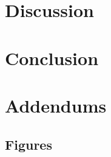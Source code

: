 \documentclass{article}
\begin{document}
\section{Discussion}
\label{sec:discussion}



\section{Conclusion}
\label{sec:conclusion}

\section{Addendums}
\label{sec:addendums}

\subsection{Figures}
\label{sec:figures}

\newpage
{}


\end{document}
